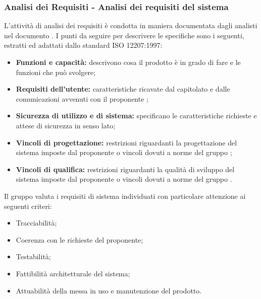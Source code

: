 \subsubsection{Analisi dei Requisiti - Analisi dei requisiti del sistema}
L'attività di analisi dei requisiti è condotta in maniera documentata dagli analisti nel documento \docNameVersionAdR{}. I punti da seguire per descrivere le specifiche sono i seguenti, estratti ed adattati dallo standard ISO 12207:1997:\\
\begin{itemize}
	\item \textbf{Funzioni e capacità:} descrivono cosa il prodotto è in grado di fare e le funzioni che può svolgere;
	\item \textbf{Requisiti dell'utente:} caratteristiche ricavate dal capitolato \projectName{} e dalle comunicazioni avvenuti con il proponente \proposerName{};
	\item \textbf{Sicurezza di utilizzo e di sistema:} specificano le caratteristiche richieste e attese di sicurezza in senso lato;
	\item \textbf{Vincoli di progettazione:} restrizioni riguardanti la progettazione del sistema imposte dal proponente o vincoli dovuti a norme del gruppo \groupName{};
	\item \textbf{Vincoli di qualifica:} restrizioni riguardanti la qualità di sviluppo del sistema imposte dal proponente o vincoli dovuti a norme del gruppo \groupName{}.
\end{itemize}
Il gruppo \groupName{} valuta i requisiti di sistema individuati con particolare attenzione ai seguenti criteri:
\begin{itemize}
	\item Tracciabilità;
	\item Coerenza con le richieste del proponente;
	\item Testabilità;
	\item Fattibilità architetturale del sistema;
	\item Attuabilità della messa in uso e manutenzione del prodotto.
\end{itemize}
